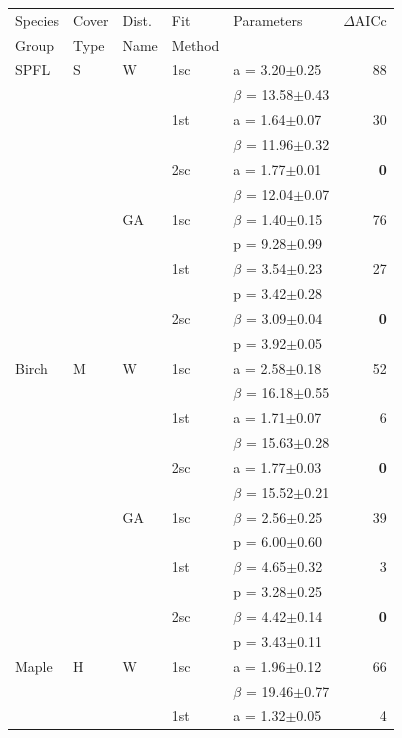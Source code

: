 \documentclass{article}
\begin{document}
\begin{table}[h!]
  {\footnotesize
\begin{tabular}{lllllr}
\toprule
Species & Cover & Dist.   & Fit  & Parameters & $\Delta$AICc \\
Group   & Type  & Name  & Method & & \\
\midrule

SPFL & S & W & 1sc & a = 3.20$\pm$0.25 & 88 \\
 &  &  &  & $\beta$ = 13.58$\pm$0.43 &  \\
 &  &  & 1st & a = 1.64$\pm$0.07 & 30 \\
 &  &  &  & $\beta$ = 11.96$\pm$0.32 &  \\
 &  &  & 2sc & a = 1.77$\pm$0.01 & \textbf{0} \\
 &  &  &  & $\beta$ = 12.04$\pm$0.07 & \textbf{} \\
 &  & GA & 1sc & $\beta$ = 1.40$\pm$0.15 & 76 \\
 &  &  &  & p = 9.28$\pm$0.99 &  \\
 &  &  & 1st & $\beta$ = 3.54$\pm$0.23 & 27 \\
 &  &  &  & p = 3.42$\pm$0.28 &  \\
 &  &  & 2sc & $\beta$ = 3.09$\pm$0.04 & \textbf{0} \\
 &  &  &  & p = 3.92$\pm$0.05 & \textbf{} \\
Birch & M & W & 1sc & a = 2.58$\pm$0.18 & 52 \\
 &  &  &  & $\beta$ = 16.18$\pm$0.55 &  \\
 &  &  & 1st & a = 1.71$\pm$0.07 & 6 \\
 &  &  &  & $\beta$ = 15.63$\pm$0.28 &  \\
 &  &  & 2sc & a = 1.77$\pm$0.03 & \textbf{0} \\
 &  &  &  & $\beta$ = 15.52$\pm$0.21 & \textbf{} \\
 &  & GA & 1sc & $\beta$ = 2.56$\pm$0.25 & 39 \\
 &  &  &  & p = 6.00$\pm$0.60 &  \\
 &  &  & 1st & $\beta$ = 4.65$\pm$0.32 & 3 \\
 &  &  &  & p = 3.28$\pm$0.25 &  \\
 &  &  & 2sc & $\beta$ = 4.42$\pm$0.14 & \textbf{0} \\
 &  &  &  & p = 3.43$\pm$0.11 & \textbf{} \\
Maple & H & W & 1sc & a = 1.96$\pm$0.12 & 66 \\
 &  &  &  & $\beta$ = 19.46$\pm$0.77 &  \\
 &  &  & 1st & a = 1.32$\pm$0.05 & 4 \\

\end{tabular}}
\end{table}
\end{document}

